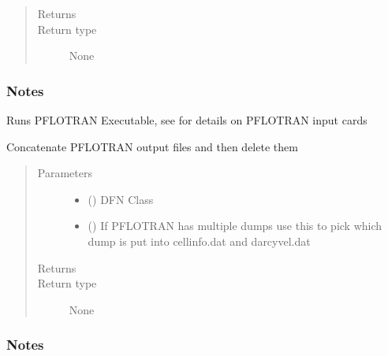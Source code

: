 \documentclass[letterpaper,10pt,english]{sphinxmanual}
\begin{document}
\begin{fulllineitems}
\begin{fulllineitems}
\begin{quote}
\begin{description}
\item[{Returns}] \leavevmode


\item[{Return type}] \leavevmode
None

\end{description}\end{quote}
\subsubsection*{Notes}

Runs PFLOTRAN Executable, see  for details on PFLOTRAN input cards

\end{fulllineitems}


\begin{fulllineitems}
\label{\detokenize{pydfnworks:pydfnworks.general.dfnworks.DFNWORKS.pflotran_cleanup}}
Concatenate PFLOTRAN output files and then delete them
\begin{quote}\begin{description}
\item[{Parameters}] \leavevmode\begin{itemize}
\item {} 
 () \textendash{} DFN Class

\item {} 
 () \textendash{} If PFLOTRAN has multiple dumps use this to pick which dump is put into cellinfo.dat and darcyvel.dat

\end{itemize}

\item[{Returns}] \leavevmode


\item[{Return type}] \leavevmode
None

\end{description}\end{quote}
\subsubsection*{Notes}


\end{fulllineitems}
\end{fulllineitems}
\end{document}
